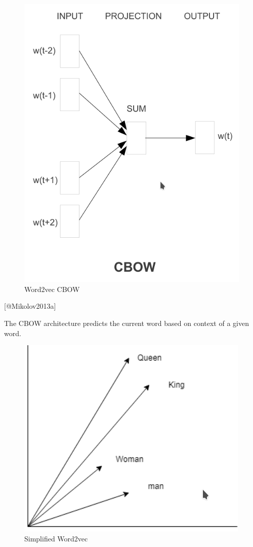\documentclass[11pt]{article}
\makeatletter
\def\maxwidth{\ifdim\Gin@nat@width>\linewidth\linewidth
    \else\Gin@nat@width\fi}
\let\Oldincludegraphics\includegraphics
\renewcommand{\includegraphics}[1]{\Oldincludegraphics[width=.8\maxwidth]{#1}}
\makeatother
\begin{document}
\begin{figure}
\centering
\includegraphics{../experiments/media/Word2Vec CBOW.png}
\caption{Word2vec CBOW}
\end{figure}

{[}@Mikolov2013a{]}

The CBOW architecture predicts the current word based on context of a
given word.

\begin{figure}
\centering
\includegraphics{../experiments/media/Word2vec simplified.png}
\caption{Simplified Word2vec}
\end{figure}
\end{document}
